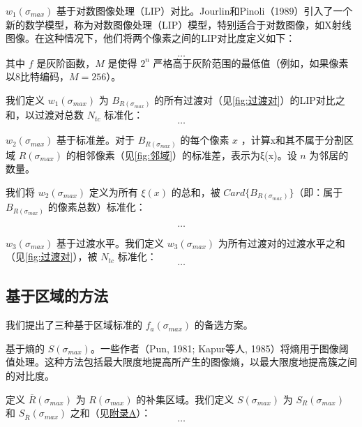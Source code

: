 $w_1(\sigma_{max})$ 基于对数图像处理（LIP）对比。Jourlin和Pinoli（1989）\cite{jourlin1989contrast}引入了一个新的数学模型，称为对数图像处理（LIP）模型，特别适合于对数图像，如X射线图像。在这种情况下，他们将两个像素之间的LIP对比度定义如下：

\begin{equation}
    \dots
\end{equation}
其中 $f$ 是灰阶函数，$M$ 是使得 $2^n$ 严格高于灰阶范围的最低值（例如，如果像素以8比特编码，$M=256$）。

我们定义 $w_1(\sigma_{max})$ 为 $B_{R(\sigma_{max})}$ 的所有过渡对（见\cref{fig:过渡对}）的LIP对比之和，以过渡对总数 $N_{tc}$ 标准化：
\begin{equation}
    \dots
\end{equation}

$w_2(\sigma_{max})$ 基于标准差。对于 $B_{R(\sigma_{max})}$ 的每个像素 $x$ ，计算x和其不属于分割区域 $R(\sigma_{max})$ 的相邻像素（见\cref{fig:邻域}）的标准差，表示为ξ(x)。设 $n$ 为邻居的数量。

我们将 $w_2(\sigma_{max})$ 定义为所有 $\xi (x)$ 的总和，被 $Card\{B_{R(\sigma_{max})}\}$（即：属于 $B_{R(\sigma_{max})}$ 的像素总数）标准化：

\begin{equation}
    \dots
\end{equation}

$w_3(\sigma_{max})$ 基于过渡水平。我们定义 $w_3(\sigma_{max})$ 为所有过渡对的过渡水平之和（见\cref{fig:过渡对}），被 $N_{tc}$ 标准化：
\begin{equation}
    \dots
\end{equation}

\subsection{基于区域的方法}

我们提出了三种基于区域标准的 $f_{a}(\sigma_{max})$ 的备选方案。

基于熵的 $S(\sigma_{max})$。一些作者（Pun, 1981\cite{pun1981entropic}; Kapur等人, 1985\cite{kapur1985new}）将熵用于图像阈值处理。这种方法包括最大限度地提高所产生的图像熵，以最大限度地提高簇之间的对比度。

定义 $\overline{R}(\sigma_{max})$ 为 $R(\sigma_{max})$ 的补集区域。我们定义 $S(\sigma_{max})$ 为 $S_{R}(\sigma_{max})$ 和 $S_{\overline{R}}(\sigma_{max})$ 之和（见\hyperref[sec:appendix_a]{附录A}）：
\begin{equation}
    \dots
\end{equation}

